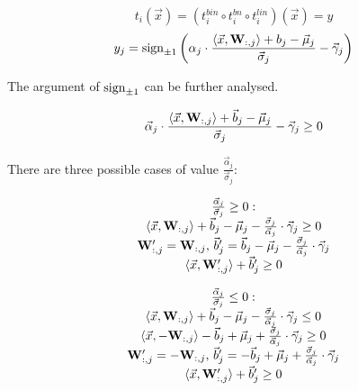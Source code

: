 \documentclass{fithesis}
\begin{document}
\begin{equation*}
    t_i(\vec x) = (t_i^{bin} \circ t_i^{bn} \circ t_i^{lin})(\vec x) = y
\end{equation*}
\begin{equation*}
    y_j = \mathrm{sign}_{\pm 1}\left( \alpha_j \cdot \frac{\langle \vec x, \mathbf{W}_{:, j}\rangle + b_j - \vec \mu_j}{\vec \sigma_j} - \vec \gamma_j \right)
\end{equation*}

The argument of $\mathrm{sign}_{\pm 1}$ can be further analysed.

\begin{equation*}
    \vec \alpha_j \cdot \frac{\langle \vec x, \mathbf{W}_{:, j}\rangle + \vec b_j - \vec \mu_j}{\vec \sigma_j} - \vec \gamma_j \geq 0
\end{equation*}

There are three possible cases of value $\frac{\vec \alpha_j}{\vec \sigma_j}$:

\begin{equation*}
    \begin{matrix}
        \frac{\vec\alpha_j}{\vec\sigma_j} \geq 0: \\
        \langle \vec x, \mathbf{W}_{:, j}\rangle + \vec b_j - \vec \mu_j - \frac{\vec \sigma_j}{\vec\alpha_j}\cdot \vec \gamma_j \geq 0\\
        \mathbf{W}'_{:, j} = \mathbf{W}_{:, j}, \,
        \vec b'_j = \vec b_j - \vec\mu_j - \frac{\vec\sigma_j}{\vec\alpha_j}\cdot \vec\gamma_j\\
        \langle \vec x, \mathbf{W}'_{:, j}\rangle + \vec b'_j \geq 0\\
    \end{matrix}
\end{equation*}

\begin{equation*}
    \begin{matrix}
        \frac{\vec\alpha_j}{\vec\sigma_j} \leq 0: \\
        \langle \vec x, \mathbf{W}_{:, j}\rangle + \vec b_j - \vec \mu_j - \frac{\vec \sigma_j}{\vec\alpha_j}\cdot \vec \gamma_j \leq 0 \\
        \langle \vec x, -\mathbf{W}_{:, j}\rangle - \vec b_j + \vec \mu_j + \frac{\vec \sigma_j}{\vec\alpha_j}\cdot \vec \gamma_j \geq 0\\
        \mathbf{W}'_{:, j} = -\mathbf{W}_{:, j}, \,
        \vec b'_j = -\vec b_j + \vec\mu_j + \frac{\vec\sigma_j}{\vec\alpha_j}\cdot \vec\gamma_j\\
        \langle \vec x, \mathbf{W}'_{:, j}\rangle + \vec b'_j \geq 0\\
    \end{matrix}
\end{equation*}
\end{document}
